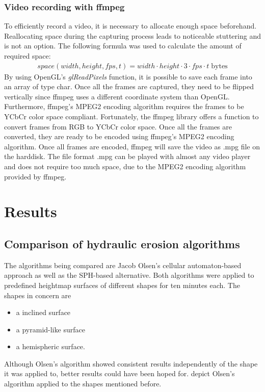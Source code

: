 \documentclass[11pt,a4paper,twoside,openright]{report}
\begin{document}
\subsection{Video recording with ffmpeg}
To efficiently record a video, it is necessary to allocate enough space beforehand. Reallocating space during the capturing process leads to noticeable stuttering and is not an option. The following formula was used to calculate the amount of required space:
\begin{align}
space(width, height, fps, t) = width \cdot height \cdot 3 \cdot fps \cdot t \; \mathrm{bytes}
\end{align}
By using OpenGL's \emph{glReadPixels} function, it is possible to save each frame into an array of type char. Once all the frames are captured, they need to be flipped vertically since ffmpeg uses a different coordinate system than OpenGL. Furthermore, ffmpeg's MPEG2 encoding algorithm requires the frames to be YCbCr color space compliant. Fortunately, the ffmpeg library offers a function to convert frames from RGB to YCbCr color space. Once all the frames are converted, they are ready to be encoded using ffmpeg's MPEG2 encoding algorithm. Once all frames are encoded, ffmpeg will save the video as .mpg file on the harddisk. The file format .mpg can be played with almost any video player and does not require too much space, due to the MPEG2 encoding algorithm provided by ffmpeg.

\chapter{Results}
\label{sec:results}

\section{Comparison of hydraulic erosion algorithms}
The algorithms being compared are Jacob Olsen's cellular automaton-based approach as well as the SPH-based alternative. Both algorithms were applied to predefined heightmap surfaces of different shapes for ten minutes each. The shapes in concern are
\begin{itemize}
\item a inclined surface
\item a pyramid-like surface
\item a hemispheric surface.
\end{itemize}
Although Olsen's algorithm showed consistent results independently of the shape it was applied to, better results could have been hoped for.  depict Olsen's algorithm applied to the shapes mentioned before.
\end{document}
